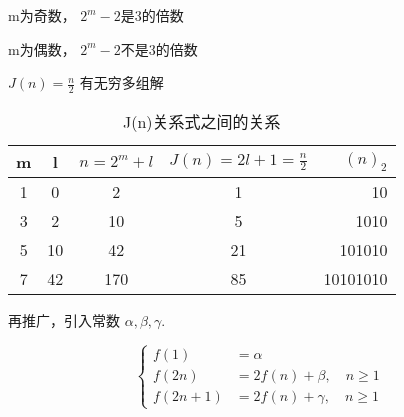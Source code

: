 \documentclass[mode=geye]{elegantnote}
\begin{document}
m为奇数， $ 2^m - 2 $是3的倍数

m为偶数， $ 2^m - 2 $不是3的倍数

$ J(n) = \frac{n}{2} $ 有无穷多组解


\begin{table}[htbp]
	\centering
	\small
	\caption{J(n)关系式之间的关系}
	\begin{tabular}{ccccr}
		\toprule
		m & l & $ n = 2^m +l $ & $ J(n) = 2l+1 = \frac{n}{2} $ & $ (n)_2 $ \\
		\midrule
		1 & 0  & 2   & 1  & 10\\
		3 & 2  & 10  & 5  & 1010\\
		5 & 10 & 42  & 21 & 101010\\
		7 & 42 & 170 & 85 & 10101010\\
		\bottomrule
	\end{tabular}%
	\label{tab:J(n)关系式之间的关系}%
\end{table}%

\begin{remark}
	再推广，引入常数 $ \alpha, \beta, \gamma $.
\end{remark}

\begin{equation}\label{J(n)forConst}
	\left\{
	\begin{aligned}
		f(1)    &= \alpha\\
		f(2n)   &= 2f(n)+\beta,  \quad n\geqslant 1\\
		f(2n+1) &= 2f(n)+\gamma, \quad n\geqslant 1
	\end{aligned}
	\right.
\end{equation}
\end{document}

